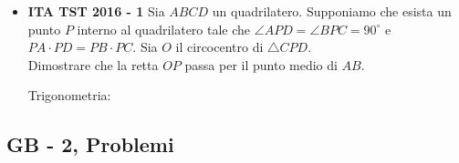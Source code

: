 \begin{itemize}
\item \textbf{ITA TST 2016 - 1} Sia $ABCD$ un quadrilatero. Supponiamo che esista un punto $P$ interno al quadrilatero tale che $\angle APD = \angle BPC = 90^{\circ}$ e $PA \cdot PD = PB \cdot PC$. Sia $O$ il circocentro di $\triangle CPD$.\\
Dimostrare che la retta $OP$ passa per il punto medio di $AB$.

\begin{sol}
Trigonometria: 
\end{sol}
 
 
 
 \end{itemize}

\subsection{GB - 2, Problemi}
